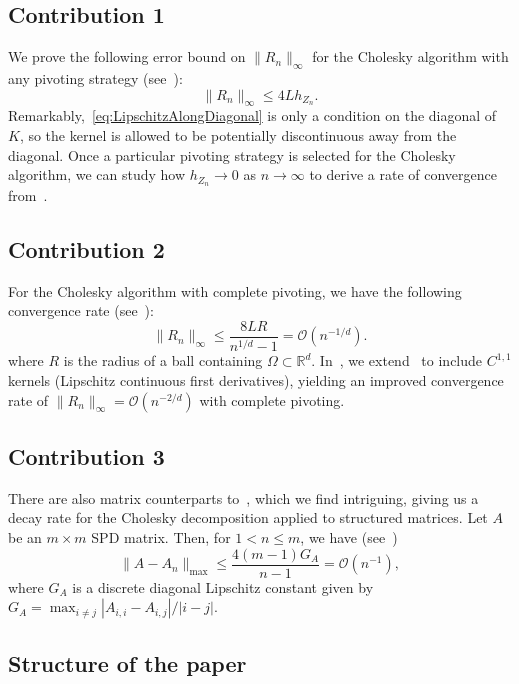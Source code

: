 \documentclass{amsart}
\theoremstyle{definition}
\theoremstyle{remark}
\begin{document}
\subsection*{Contribution 1} 
We prove the following error bound on $\|R_n\|_\infty$ for the Cholesky algorithm with any pivoting strategy (see~): 
\[
\|R_n\|_{\infty} \leq  4L h_{Z_n}.
\]
Remarkably,~\cref{eq:LipschitzAlongDiagonal} is only a condition on the diagonal of $K$, so the kernel is allowed to be potentially discontinuous away from the diagonal. Once a particular pivoting strategy is selected for the Cholesky algorithm, we can study how $h_{Z_n}\rightarrow0$ as $n\rightarrow \infty$ to derive a rate of convergence from~. 

\subsection*{Contribution 2} 
For the Cholesky algorithm with complete pivoting, we have the following convergence rate (see~): 
\[
\|R_n\|_{\infty} \leq \frac{8LR}{n^{1/d}-1} = \mathcal{O}(n^{-1/d}).
\] 
where $R$ is the radius of a ball containing $\Omega\subset \mathbb{R}^d$. In~, we extend~ to include $C^{1, 1}$ kernels (Lipschitz continuous first derivatives), yielding an improved convergence rate of $\|R_n\|_\infty = \mathcal{O}(n^{-2/d})$ with complete pivoting. 


\subsection*{Contribution 3}
There are also matrix counterparts to~, which we find intriguing, giving us a decay rate for the Cholesky decomposition applied to structured matrices. 
Let $A$ be an $m\times m$ SPD matrix. Then, for $1<n\leq m$, we have (see~)
\begin{equation*}
        \|A - A_n\|_{\max} \leq \frac{4(m-1)G_A}{n-1} = \mathcal{O}(n^{-1}), 
    \end{equation*}
    where $G_A$ is a discrete diagonal Lipschitz constant given by $G_A = \max_{i\neq j}|A_{i, i}-A_{i, j}|/|i-j|$. 

\subsection{Structure of the paper}
\end{document}
